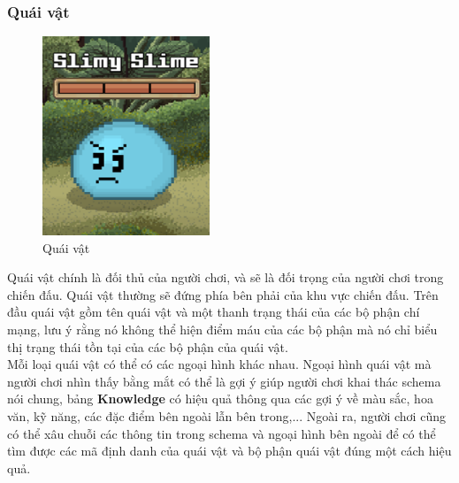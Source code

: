 \subsubsection{Quái vật}
\begin{figure}[H]
	\centering
	\includegraphics[width=5cm]{Images/Monster.png}
	\vspace{0.5cm}
	\caption{Quái vật}
\end{figure}
\hspace*{0.5cm} Quái vật chính là đối thủ của người chơi, và sẽ là đối trọng của người chơi trong chiến đấu. Quái vật thường sẽ đứng phía bên phải của khu vực chiến đấu. Trên đầu quái vật gồm tên quái vật và một thanh trạng thái của các bộ phận chí mạng, lưu ý rằng nó không thể hiện điểm máu của các bộ phận mà nó chỉ biểu thị trạng thái tồn tại của các bộ phận của quái vật.\\
\hspace*{0.5cm} Mỗi loại quái vật có thể có các ngoại hình khác nhau. Ngoại hình quái vật mà người chơi nhìn thấy bằng mắt có thể là gợi ý giúp người chơi khai thác schema nói chung, bảng \textbf{Knowledge} có hiệu quả thông qua các gợi ý về màu sắc, hoa văn, kỹ năng, các đặc điểm bên ngoài lẫn bên trong,... Ngoài ra, người chơi cũng có thể xâu chuỗi các thông tin trong schema và ngoại hình bên ngoài để có thể tìm được các mã định danh của quái vật và bộ phận quái vật đúng một cách hiệu quả.\\

